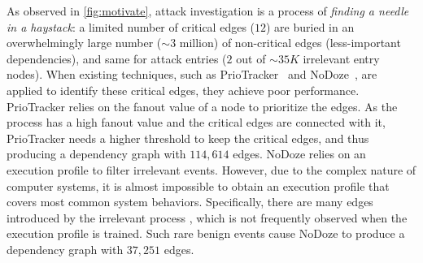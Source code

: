 As observed in \cref{fig:motivate}, attack investigation is a process of \emph{finding a needle in a haystack}: 
a limited number of critical edges (\ie $12$) are buried in an overwhelmingly large number ($\sim 3$ million) of non-critical edges (\ie less-important dependencies),
and same for attack entries (\ie $2$ out of $\sim 35K$ irrelevant entry nodes).
When existing techniques, such as PrioTracker~\cite{liu2018priotracker} and NoDoze~\cite{hassan2019nodoze}, are applied to identify these critical edges, they achieve poor performance.
PrioTracker relies on the fanout value of a node to prioritize the edges.
As the process  has a high fanout value and the critical edges are connected with it, PrioTracker needs a higher threshold to keep the critical edges, and thus producing a dependency graph with $114,614$ edges.
NoDoze relies on an execution profile to filter irrelevant events.
However, due to the complex nature of computer systems, it is almost impossible to obtain an execution profile that covers most common system behaviors.
Specifically, there are many edges introduced by the irrelevant process , which is not frequently observed when the execution profile is trained.
Such rare benign events cause NoDoze to produce a dependency graph with $37,251$ edges.


